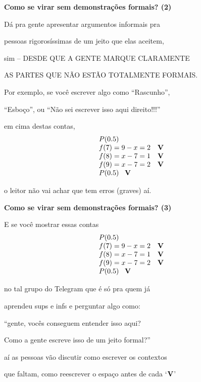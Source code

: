 \documentclass[oneside,12pt]{article}
\begin{document}
{\bf Como se virar sem demonstrações formais? (2)}

Dá pra gente apresentar argumentos informais pra

pessoas rigorosíssimas de um jeito que elas aceitem,

sim -- DESDE QUE A GENTE MARQUE CLARAMENTE

AS PARTES QUE NÃO ESTÃO TOTALMENTE FORMAIS.

\msk

Por exemplo, se você escrever algo como ``Rascunho'',

``Esboço'', ou ``Não sei escrever isso aqui direito!!!''

em cima destas contas,
%
$$\begin{array}{ll}
  P(0.5) \\
  f(7) = 9-x = 2 & \mathbf{V} \\ 
  f(8) = x-7 = 1 & \mathbf{V} \\ 
  f(9) = x-7 = 2 & \mathbf{V} \\ 
  P(0.5) \;\;\; \mathbf{V} \\
  \end{array}
$$

o leitor não vai achar que tem erros (graves) aí.

\newpage


{\bf Como se virar sem demonstrações formais? (3)}

E se você mostrar essas contas
%
$$\begin{array}{ll}
  P(0.5) \\
  f(7) = 9-x = 2 & \mathbf{V} \\ 
  f(8) = x-7 = 1 & \mathbf{V} \\ 
  f(9) = x-7 = 2 & \mathbf{V} \\ 
  P(0.5) \;\;\; \mathbf{V} \\
  \end{array}
$$

no tal grupo do Telegram que é só pra quem já

aprendeu sups e infs e perguntar algo como:

``gente, vocês conseguem entender isso aqui?

Como a gente escreve isso de um jeito formal?''

aí as pessoas vão discutir como escrever os contextos

que faltam, como reescrever o espaço antes de cada `$\mathbf{V}$'
\end{document}
